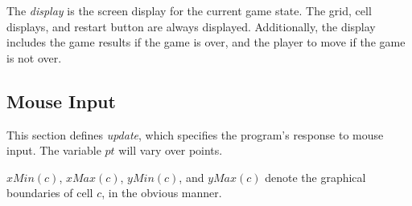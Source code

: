 \documentclass{../lib}
\begin{document}
\begin{ledDef}
\end{ledDef}

\begin{ledCmnt}
The {\em display} is the screen display for the current game state. The grid, cell displays, and restart button are always displayed. Additionally, the display includes the game results if the game is over, and the player to move if the game is not over.
\end{ledCmnt}

\begin{ledDef}
\end{ledDef}

\begin{ledCmnt}
\section{Mouse Input}

This section defines {\em update}, which specifies the program's response to mouse input. The variable $pt$ will vary over points.

$xMin(c)$, $xMax(c)$, $yMin(c)$, and $yMax(c)$ denote the graphical boundaries of cell $c$, in the obvious manner.
\end{ledCmnt}

\begin{ledDef}
\end{ledDef}
\end{document}
